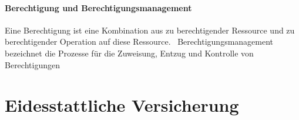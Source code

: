 \documentclass[11pt]{article}
\begin{document}
\paragraph{Berechtigung und Berechtigungsmanagement}
Eine Berechtigung ist eine Kombination aus zu berechtigender Ressource und zu berechtigender Operation auf diese Ressource.~\cite{tsolkas2017} Berechtigungsmanagement bezeichnet die Prozesse für die Zuweisung, Entzug und Kontrolle von Berechtigungen~\cite{orp4}
\section{Eidesstattliche Versicherung}
\newpage
\printbibliography[notkeyword={quelle}, title={Literaturverzeichnis}]
\newpage
\printbibliography[keyword={quelle}, title={Quellenverzeichnis}]
\newpage
\listoffigures
\end{document}

